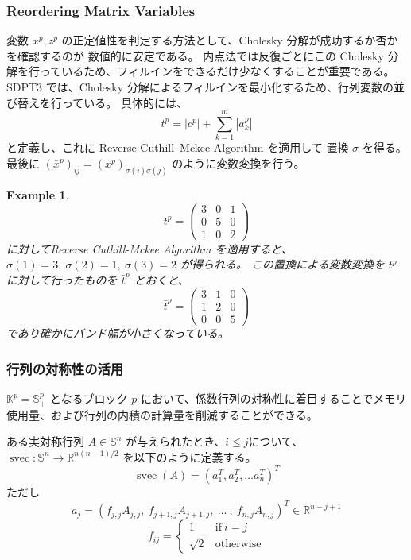 \documentclass{jsarticle}
\newtheorem{example}{Example}
\begin{document}
\subsubsection{Reordering Matrix Variables}
変数 $x^p, z^p$ の正定値性を判定する方法として、Cholesky 分解が成功するか否かを確認するのが
数値的に安定である。 
内点法では反復ごとにこの Cholesky 分解を行っているため、フィルインをできるだけ少なくすることが重要である。  
SDPT3 では、Cholesky 分解によるフィルインを最小化するため、行列変数の並び替えを行っている。
具体的には、
\[
  t^p = |c^p| + \sum_{k=1}^m |a^p_k|
\]
と定義し、これに Reverse Cuthill--Mckee Algorithm を適用して
置換 $\sigma$ を得る。
最後に $(\bar{x}^p)_{ij} = (x^p)_{\sigma(i)\sigma(j)}$ のように変数変換を行う。

\begin{example}
\[
    t^p = \begin{pmatrix}
        3 & 0 & 1 \\
        0 & 5 & 0 \\
        1 & 0 & 2
    \end{pmatrix}
\]に対してReverse Cuthill-Mckee Algorithm を適用すると、 $\sigma(1)=3, ~ \sigma(2)=1, ~ \sigma(3)=2$ が得られる。
この置換による変数変換を $t^p$ に対して行ったものを $\bar{t}^p$ とおくと、
\[
    \bar{t}^p = \begin{pmatrix}
        3 & 1 & 0 \\
        1 & 2 & 0 \\
        0 & 0 & 5
    \end{pmatrix}
\]
であり確かにバンド幅が小さくなっている。
\end{example}


\subsubsection{行列の対称性の活用}
$\mathbb{K}^p=\mathbb{S}_+^p$ となるブロック $p$ において、係数行列の対称性に着目することでメモリ使用量、および行列の内積の計算量を削減することができる。

ある実対称行列 $A\in \mathbb{S}^n$ が与えられたとき、$i\leq j$について、 $\operatorname{svec}: \mathbb{S}^n \rightarrow \mathbb{R}^{n(n+1)/2}$ を以下のように定義する。
\[ \operatorname{svec}(A)= (a_1^T, a_2^T, \ldots a_n^T)^T \]
ただし
\[ a_j = (f_{j,j} A_{j,j}, ~ f_{j+1,j}A_{j+1,j}, ~ \ldots ~ , ~ f_{n,j} A_{n,j})^T \in \mathbb{R}^{n-j+1} \]
\[ f_{ij}= \begin{cases} 1 & \text{if} ~ i=j \\ \sqrt{2} & \text{otherwise} \end{cases}\]
\end{document}

